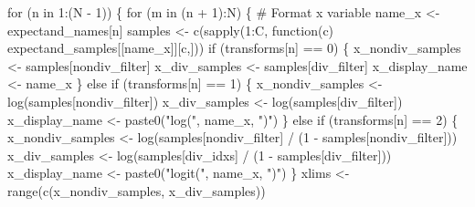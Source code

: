 \documentclass[
  letterpaper,
  DIV=11,
  numbers=noendperiod]{scrartcl}
\newenvironment{Shaded}{\begin{snugshade}}{\end{snugshade}}
\newcommand{\CommentTok}[1]{\textcolor[rgb]{0.37,0.37,0.37}{#1}}
\newcommand{\ControlFlowTok}[1]{\textcolor[rgb]{0.00,0.23,0.31}{#1}}
\newcommand{\DecValTok}[1]{\textcolor[rgb]{0.68,0.00,0.00}{#1}}
\newcommand{\FunctionTok}[1]{\textcolor[rgb]{0.28,0.35,0.67}{#1}}
\newcommand{\NormalTok}[1]{\textcolor[rgb]{0.00,0.23,0.31}{#1}}
\newcommand{\OtherTok}[1]{\textcolor[rgb]{0.00,0.23,0.31}{#1}}
\newcommand{\SpecialCharTok}[1]{\textcolor[rgb]{0.37,0.37,0.37}{#1}}
\newcommand{\StringTok}[1]{\textcolor[rgb]{0.13,0.47,0.30}{#1}}
\begin{document}
\begin{Shaded}
\begin{Highlighting}[]
  \ControlFlowTok{for}\NormalTok{ (n }\ControlFlowTok{in} \DecValTok{1}\SpecialCharTok{:}\NormalTok{(N }\SpecialCharTok{{-}} \DecValTok{1}\NormalTok{)) \{}
    \ControlFlowTok{for}\NormalTok{ (m }\ControlFlowTok{in}\NormalTok{ (n }\SpecialCharTok{+} \DecValTok{1}\NormalTok{)}\SpecialCharTok{:}\NormalTok{N) \{}
      \CommentTok{\# Format x variable}
\NormalTok{      name\_x }\OtherTok{\textless{}{-}}\NormalTok{ expectand\_names[n]}
\NormalTok{      samples }\OtherTok{\textless{}{-}} \FunctionTok{c}\NormalTok{(}\FunctionTok{sapply}\NormalTok{(}\DecValTok{1}\SpecialCharTok{:}\NormalTok{C, }
                          \ControlFlowTok{function}\NormalTok{(c) expectand\_samples[[name\_x]][c,]))}
      \ControlFlowTok{if}\NormalTok{ (transforms[n] }\SpecialCharTok{==} \DecValTok{0}\NormalTok{) \{}
\NormalTok{        x\_nondiv\_samples }\OtherTok{\textless{}{-}}\NormalTok{ samples[nondiv\_filter]}
\NormalTok{        x\_div\_samples }\OtherTok{\textless{}{-}}\NormalTok{ samples[div\_filter]}
\NormalTok{        x\_display\_name }\OtherTok{\textless{}{-}}\NormalTok{ name\_x}
\NormalTok{      \} }\ControlFlowTok{else} \ControlFlowTok{if}\NormalTok{ (transforms[n] }\SpecialCharTok{==} \DecValTok{1}\NormalTok{) \{}
\NormalTok{        x\_nondiv\_samples }\OtherTok{\textless{}{-}} \FunctionTok{log}\NormalTok{(samples[nondiv\_filter])}
\NormalTok{        x\_div\_samples }\OtherTok{\textless{}{-}} \FunctionTok{log}\NormalTok{(samples[div\_filter])}
\NormalTok{        x\_display\_name }\OtherTok{\textless{}{-}} \FunctionTok{paste0}\NormalTok{(}\StringTok{"log("}\NormalTok{, name\_x, }\StringTok{")"}\NormalTok{)}
\NormalTok{      \} }\ControlFlowTok{else} \ControlFlowTok{if}\NormalTok{ (transforms[n] }\SpecialCharTok{==} \DecValTok{2}\NormalTok{) \{}
\NormalTok{        x\_nondiv\_samples }\OtherTok{\textless{}{-}} \FunctionTok{log}\NormalTok{(samples[nondiv\_filter] }\SpecialCharTok{/} 
\NormalTok{                                (}\DecValTok{1} \SpecialCharTok{{-}}\NormalTok{ samples[nondiv\_filter]))}
\NormalTok{        x\_div\_samples }\OtherTok{\textless{}{-}} \FunctionTok{log}\NormalTok{(samples[div\_idxs] }\SpecialCharTok{/}
\NormalTok{                             (}\DecValTok{1} \SpecialCharTok{{-}}\NormalTok{ samples[div\_filter]))}
\NormalTok{        x\_display\_name }\OtherTok{\textless{}{-}} \FunctionTok{paste0}\NormalTok{(}\StringTok{"logit("}\NormalTok{, name\_x, }\StringTok{")"}\NormalTok{)}
\NormalTok{      \}}
\NormalTok{      xlims }\OtherTok{\textless{}{-}} \FunctionTok{range}\NormalTok{(}\FunctionTok{c}\NormalTok{(x\_nondiv\_samples, x\_div\_samples))}
    

\end{Highlighting}
\end{Shaded}
\end{document}
